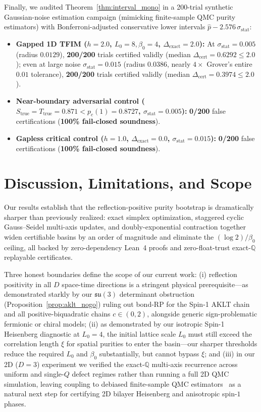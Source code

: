 \documentclass[11pt,a4paper]{article}
\theoremstyle{definition}
\newcommand{\Q}{\mathbb{Q}}
\begin{document}
Finally, we audited Theorem~\ref{thm:interval_mono} in a 200-trial synthetic Gaussian-noise estimation campaign (mimicking finite-sample QMC purity estimators) with Bonferroni-adjusted conservative lower intervals $\hat{p} - 2.576\,\sigma_{\mathrm{stat}}$:
\begin{itemize}[leftmargin=1.6em,itemsep=2pt]
  \item \textbf{Gapped 1D TFIM ($h=2.0$, $L_0=8, \beta_0=4$, $\Delta_{\mathrm{exact}}=2.0$):} At $\sigma_{\mathrm{stat}} = 0.005$ (radius $0.0129$), \textbf{200/200} trials certified validly (median $\Delta_{\mathrm{cert}} = 0.6292 \le 2.0$); even at large noise $\sigma_{\mathrm{stat}} = 0.015$ (radius $0.0386$, nearly $4\times$ Grover's entire $0.01$ tolerance), \textbf{200/200} trials certified validly (median $\Delta_{\mathrm{cert}} = 0.3974 \le 2.0$).
  \item \textbf{Near-boundary adversarial control ($S_{\mathrm{true}} = T_{\mathrm{true}} = 0.871 < p_c(1) = 0.8727$, $\sigma_{\mathrm{stat}} = 0.005$):} \textbf{0/200} false certifications (\textbf{100\% fail-closed soundness}).
  \item \textbf{Gapless critical control ($h=1.0$, $\Delta_{\mathrm{exact}}=0.0$, $\sigma_{\mathrm{stat}}=0.015$):} \textbf{0/200} false certifications (\textbf{100\% fail-closed soundness}).
\end{itemize}

\section{Discussion, Limitations, and Scope}
\label{sec:discussion}

Our results establish that the reflection-positive purity bootstrap is dramatically sharper than previously realized: exact simplex optimization, staggered cyclic Gauss--Seidel multi-axis updates, and doubly-exponential contraction together widen certifiable basins by an order of magnitude and eliminate the $(\log 2)/\beta_0$ ceiling, all backed by zero-dependency Lean~4 proofs and zero-float-trust exact-$\Q$ replayable certificates.

Three honest boundaries define the scope of our current work: (i) reflection positivity in all $D$ space-time directions is a stringent physical prerequisite—as demonstrated starkly by our $\mathfrak{su}(3)$ determinant obstruction (Proposition~\ref{prop:aklt_nogo}) ruling out bond-RP for the Spin-1 AKLT chain and all positive-biquadratic chains $c \in (0,2)$, alongside generic sign-problematic fermionic or chiral models; (ii) as demonstrated by our isotropic Spin-1 Heisenberg diagnostic at $L_0=4$, the initial lattice scale $L_0$ must still exceed the correlation length $\xi$ for spatial purities to enter the basin—our sharper thresholds reduce the required $L_0$ and $\beta_0$ substantially, but cannot bypass $\xi$; and (iii) in our 2D ($D=3$) experiment we verified the exact-$\Q$ multi-axis recurrence across uniform and single-$Q$ defect regimes rather than running a full 2D QMC simulation, leaving coupling to debiased finite-sample QMC estimators~\cite{Antigravity2026QCQMC} as a natural next step for certifying 2D bilayer Heisenberg and anisotropic spin-$1$ phases.



\end{document}
